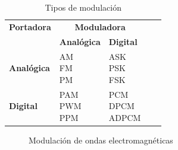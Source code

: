 \begin{table}[!h]\centering
\centering
\caption{Tipos de modulaci\'on}
\label{tab:06.tipos.modulacion}
  
{\footnotesize

\begin{tabular}{lllll} \hline
  {\bf Portadora} & \multicolumn{2}{c}{\bf Moduladora} \\ \cline{2-3}
& {\bf Anal\'ogica} & {\bf Digital}  \\ \hline \rowcolor{yellow!30}
{\bf Anal\'ogica} & \parbox{0.4\textwidth}{\ac{AM} \\ \ac{FM} \\ \ac{PM}} & \parbox{0.4\textwidth}{\ac{ASK} \\ \ac{PSK} \\ 
\ac{FSK}}  \\ 
{\bf Digital}  & \parbox{0.4\textwidth}{\ac{PAM} \\ \ac{PWM} \\ \ac{PPM} } & \parbox{0.4\textwidth}{\ac{PCM} \\ \ac{DPCM} \\ \ac{ADPCM}} \\ \hline
\end{tabular}

}

\end{table}


  \begin{figure}[!h]
    \centering
{} \hspace{20pt}
\caption{Modulaci\'on de ondas electromagn\'eticas}
  \end{figure}


